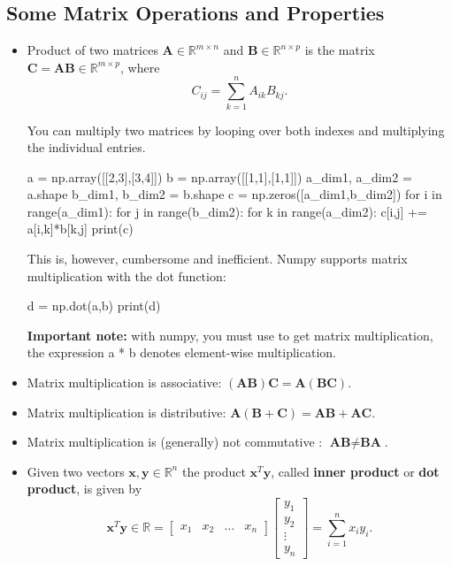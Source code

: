 \subsection{Some Matrix Operations and Properties}
\begin{itemize}
\item Product of two matrices $\textbf{A} \in \mathbb{R}^{m\times n}$ and $\textbf{B} \in \mathbb{R}^{n\times p}$
is the matrix $\textbf{C}=\textbf{AB} \in \mathbb{R}^{m\times p}$, where 
\begin{equation*}
C_{ij}=\sum\limits_{k=1}^{n}A_{ik}B_{kj}.
\end{equation*}

\begin{exercise}
You can multiply two matrices by looping over both indexes and multiplying the individual entries.
\begin{python}
a = np.array([[2,3],[3,4]])
b = np.array([[1,1],[1,1]])
a_dim1, a_dim2 = a.shape
b_dim1, b_dim2 = b.shape
c = np.zeros([a_dim1,b_dim2])
for i in range(a_dim1):
   for j in range(b_dim2):
       for k in range(a_dim2):
          c[i,j] += a[i,k]*b[k,j]
print(c)
\end{python}

This is, however, cumbersome and inefficient. Numpy supports matrix multiplication with the dot function:

\begin{python}
d = np.dot(a,b)
print(d)
\end{python}

\textbf{Important note:} with numpy, you must use  to get matrix multiplication, the expression {a * b} denotes element-wise multiplication.
\end{exercise}

\item Matrix multiplication is associative: $(\textbf{AB})\textbf{C}= \textbf{A}(\textbf{BC})$.
\item Matrix multiplication is distributive: $\textbf{A}(\textbf{B}+\textbf{C})= \textbf{AB} + \textbf{AC}$.
\item Matrix multiplication is (generally) not commutative : $\textbf{AB} \neq \textbf{BA}$.
\item Given two vectors $\textbf{x},\textbf{y} \in \mathbb{R}^{n}$ the product $\textbf{x}^{T}\textbf{y}$, called {\bf inner product}
or {\bf dot product}, is given by
\begin{equation*}
\textbf{x}^{T}\textbf{y} \in \mathbb{R} = \left[\begin{array}{cccc}
x_{1}&x_{2}&\ldots&x_{n}\end{array}\right] \left[\begin{array}{c}
y_{1} \\
y_{2} \\
\vdots \\
y_{n}
\end{array}\right] = \sum\limits_{i=1}^{n}x_{i}y_{i}.
\end{equation*}


\end{itemize}
